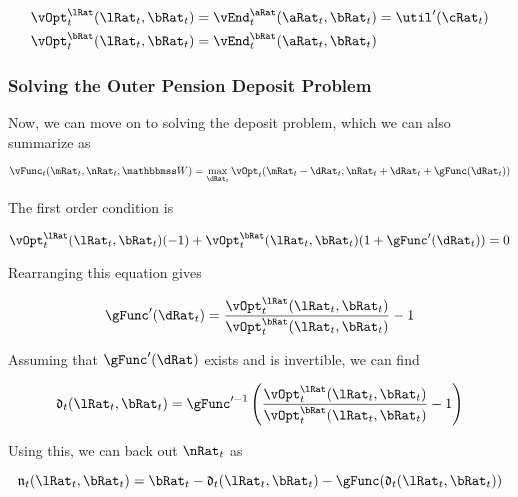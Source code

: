 \documentclass[\econtexRoot/EGMN]{subfiles}
\begin{document}
\begin{equation}
  \begin{split}
    \vOpt_{t}^{\lRat}(\lRat_{t}, \bRat_{t}) & =
    \vEnd_{t}^{\aRat}(\aRat_{t}, \bRat_{t}) = \util'(\cRat_{t}) \\
    \vOpt_{t}^{\bRat}(\lRat_{t}, \bRat_{t}) & =
    \vEnd_{t}^{\bRat}(\aRat_{t}, \bRat_{t})
  \end{split}
\end{equation}

\subsubsection{Solving the Outer Pension Deposit Problem}

Now, we can move on to solving the deposit problem, which we can also summarize
as

\begin{equation}
  \vFunc_{t}(\mRat_{t}, \nRat_{t}, \Work) = \max_{\dRat_{t}}
  \vOpt_{t}(\mRat_{t}
  - \dRat_{t}, \nRat_{t} + \dRat_{t} + \gFunc(\dRat_{t}))
\end{equation}

The first order condition is

\begin{equation}
  \vOpt_{t}^{\lRat}(\lRat_{t}, \bRat_{t})(-1) +
  \vOpt_{t}^{\bRat}(\lRat_{t}, \bRat_{t})(1+\gFunc'(\dRat_{t})) = 0
\end{equation}

Rearranging this equation gives

\begin{equation}
  \gFunc'(\dRat_{t}) = \frac{\vOpt_{t}^{\lRat}(\lRat_{t},
    \bRat_{t})}{\vOpt_{t}^{\bRat}(\lRat_{t}, \bRat_{t})} - 1
\end{equation}

Assuming that $\gFunc'(\dRat)$ exists and is invertible, we can find

\providecommand{\dEndFunc}{\ensuremath{\mathfrak{d}}}

\begin{equation}
  \dEndFunc_{t}(\lRat_{t}, \bRat_{t}) = \gFunc'^{-1}\left(
  \frac{\vOpt_{t}^{\lRat}(\lRat_{t},
    \bRat_{t})}{\vOpt_{t}^{\bRat}(\lRat_{t},
    \bRat_{t})} - 1 \right)
\end{equation}

Using this, we can back out $\nRat_{t}$ as

\providecommand{\nEndFunc}{\ensuremath{\mathfrak{n}}}

\begin{equation}
  \nEndFunc_{t}(\lRat_{t}, \bRat_{t}) = \bRat_{t} -
  \dEndFunc_{t}(\lRat_{t}, \bRat_{t}) - \gFunc(\dEndFunc_{t}(\lRat_{t},
    \bRat_{t}))
\end{equation}
\end{document}
